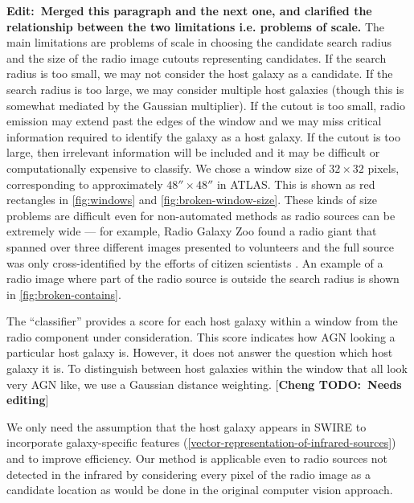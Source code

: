 \documentclass[fleqn,usenatbib,usedcolumn]{mnras}
\newcommand{\cheng}[1]{ {\color{teal}[{\bf Cheng TODO:~{#1}}]} }
\newcommand{\matthew}[2]{ {\color{white!20!violet}[{\bf TODO(#1):~{#2}}]} }
\newcommand{\edit}[1]{{\bf Edit:~{#1}}}
\begin{document}
    \edit{Merged this paragraph and the next one, and clarified the relationship between the two limitations i.e. problems of scale.} The main limitations are problems of scale in choosing the candidate search radius and the size of the radio image cutouts representing candidates. If the search radius is too small, we may not consider the host galaxy as a candidate. If the search radius is too large, we may consider multiple host galaxies (though this is somewhat mediated by the Gaussian multiplier). If the cutout is too small, radio emission may extend past the edges of the window and we may miss critical information required to identify the galaxy as a host galaxy. If the cutout is too large, then irrelevant information will be included and it may be difficult or computationally expensive to classify. We chose a window size of $32 \times 32$ pixels, corresponding to approximately $48'' \times 48''$ in ATLAS. This is shown as red rectangles in \autoref{fig:windows} and \autoref{fig:broken-window-size}. These kinds of size problems are difficult even for non-automated methods as radio sources can be extremely wide --- for example, Radio Galaxy Zoo found a radio giant that spanned over three different images presented to volunteers and the full source was only cross-identified by the efforts of citizen scientists \citep{banfield15}. An example of a radio image where part of the radio source is outside the search radius is shown in \autoref{fig:broken-contains}.

    The ``classifier'' provides a score for each host galaxy within a window from the radio
    component under consideration. This score indicates how AGN looking a particular host
    galaxy is. However, it does not answer the question which host galaxy it is. To distinguish
    between host galaxies within the window that all look very AGN like, we use a Gaussian distance
    weighting. \cheng{Needs editing}


    We only need the assumption that the host galaxy appears in SWIRE to
    incorporate galaxy-specific features
    (\autoref{vector-representation-of-infrared-sources}) and to improve
    efficiency. Our method is applicable even to radio sources not detected in the infrared
    by considering every pixel of the radio image as a candidate location as would be done in the original computer vision approach.
\end{document}
